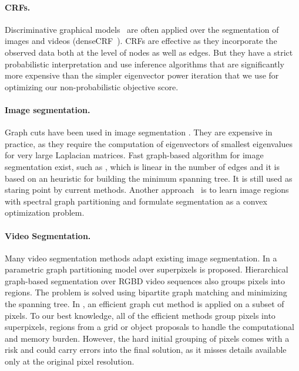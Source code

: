 \documentclass{article}
\begin{document}
\paragraph{CRFs.} Discriminative graphical models~\cite{kumar2003discriminative} 
are often applied over the segmentation of images and videos (denseCRF~\cite{denseCRF}). CRFs are effective as they incorporate the observed data both at the level of nodes as well as edges. But they have a strict probabilistic interpretation and use inference algorithms that are significantly more expensive than the simpler eigenvector power iteration that we use for optimizing our non-probabilistic objective score.

\paragraph{Image segmentation.} Graph cuts have been used in image segmentation \cite{img_normalized_cut_malik_2000}. They are expensive in practice, as they require the computation of eigenvectors of smallest eigenvalues for very large Laplacian matrices. Fast graph-based algorithm for image segmentation exist, such as \cite{img_efficient_graph_based_felzen_2004}, which is linear in the number of edges and it is based on an heuristic for building the minimum spanning tree. It is still used as staring point by current methods. Another approach~\cite{img_weakly_superv_2015} is to learn image regions with spectral graph partitioning and formulate segmentation as a convex optimization problem.

\paragraph{Video Segmentation.} Many video segmentation methods adapt existing image segmentation. In \cite{video_efficient_param_graph_part_2015} a parametric graph partitioning model over superpixels is proposed. Hierarchical graph-based segmentation over RGBD video sequences \cite{video_efficient_hierarch_rgbd_2018} also groups pixels into regions. The problem is solved using bipartite graph matching and minimizing the spanning tree. In \cite{video_unsup_segm_motion_2018}, an efficient graph cut method is applied on a subset of pixels. To our best knowledge, all of the efficient methods group pixels into superpixels, regions from a grid or object proposals to handle the computational and memory burden. However, the hard initial grouping of pixels comes with a risk and could carry errors into the final solution, as it misses details available only at the original pixel resolution.
\end{document}
